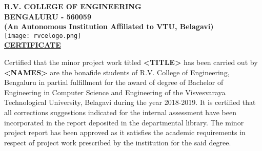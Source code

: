 \documentclass[12pt]{report}
\begin{document}
	\newpage
	\restoregeometry
	\begin{center}
		\textbf {
			\LARGE R.V. COLLEGE OF ENGINEERING \\ 
			\Large BENGALURU - 560059\\ 
			\large(An Autonomous Institution Affiliated to VTU, Belagavi)\\[0.3cm]
		}
		\texttt{[image: rvcelogo.png]}\\[0.3cm]
			\Large \textbf{\underline {CERTIFICATE}}\\
		\end{center}
		\linespread{1.2}\normalsize \begin{center} \justify
		Certified that the minor project work titled \textbf{<TITLE>} has been carried out by \textbf{<NAMES>} are the bonafide students of R.V. College of Engineering, Bengaluru in partial fulfillment for the award of degree of Bachelor of Engineering in Computer Science and Engineering of the Visvesvaraya Technological University, Belagavi during the year 2018-2019. It is certified that all corrections suggestions indicated for the internal assessment have been incorporated in the report deposited in the departmental library. The minor project report has been approved as it satisfies the academic requirements in respect of project work prescribed by the institution for the said degree.
		\end{center} 
		\linespread{1}
\end{document}
